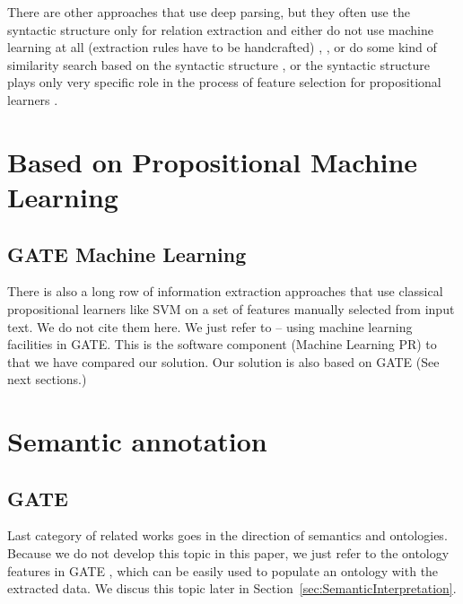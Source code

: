There are other approaches that use deep parsing, but they often use the syntactic structure only for relation extraction and either do not use machine learning at all (extraction rules have to be handcrafted) 
\citep{Yakushiji2001},
\citep{RelEx},
\citep{Buyko:dependencyGraphs}
or do some kind of similarity search based on the syntactic structure
\citep{Etzioni08informationExtraction},
\citep{Wang:SimilarityTreeSkeletons}
or the syntactic structure plays only very specific role in the process of feature selection for propositional learners %
\citep{Bunescu:DependencyPaths}.

\section{Based on Propositional Machine Learning}
\subsection{GATE Machine Learning}
There is also a long row of information extraction approaches that use classical propositional learners like SVM on a set of features manually selected from input text. We do not cite them here. We just refer to \citep{Yaoyong09a} -- using machine learning facilities in GATE. This is the software component (Machine Learning PR) to that we have compared our solution. Our solution is also based on GATE (See next sections.)

\section{Semantic annotation}
\subsection{GATE}
Last category of related works goes in the direction of semantics and ontologies. Because we do not develop this topic in this paper, we just refer to the ontology features in GATE \citep{Bon04b}, which can be easily used to populate an ontology with the extracted data. We discus this topic later in Section~\ref{sec:SemanticInterpretation}.

